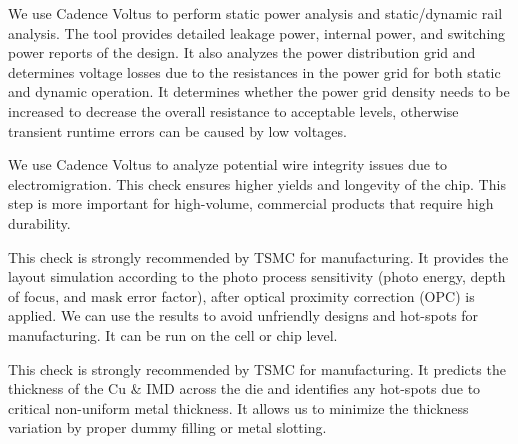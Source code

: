 \begin{cbxlist}{1.5em}{0em}{0.5em}
  \item {} We use Cadence Voltus to perform static
     power analysis and static/dynamic rail analysis. The tool provides
     detailed leakage power, internal power, and switching power reports
     of the design. It also analyzes the power distribution grid and
     determines voltage losses due to the resistances in the power grid
     for both static and dynamic operation. It determines whether the
     power grid density needs to be increased to decrease the overall
     resistance to acceptable levels, otherwise transient runtime errors
     can be caused by low voltages.

  \item {} We use Cadence Voltus to analyze
     potential wire integrity issues due to electromigration. This check
     ensures higher yields and longevity of the chip. This step is more
     important for high-volume, commercial products that require high
     durability.

  \item {} This check is
     strongly recommended by TSMC for manufacturing. It provides the
     layout simulation according to the photo process sensitivity (photo
     energy, depth of focus, and mask error factor), after optical
     proximity correction (OPC) is applied. We can use the results to
     avoid unfriendly designs and hot-spots for manufacturing. It can be
     run on the cell or chip level.

  \item {}
     This check is strongly recommended by TSMC for manufacturing. It
     predicts the thickness of the Cu \& IMD across the die and
     identifies any hot-spots due to critical non-uniform metal
     thickness. It allows us to minimize the thickness variation by
     proper dummy filling or metal slotting.

\end{cbxlist}


